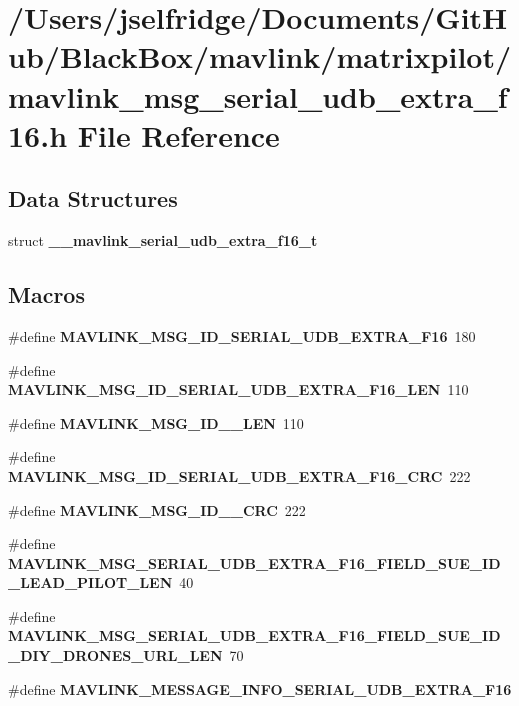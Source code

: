 \section{/\+Users/jselfridge/\+Documents/\+Git\+Hub/\+Black\+Box/mavlink/matrixpilot/mavlink\+\_\+msg\+\_\+serial\+\_\+udb\+\_\+extra\+\_\+f16.h File Reference}
\label{mavlink__msg__serial__udb__extra__f16_8h}
\subsection*{Data Structures}
\begin{DoxyCompactItemize}
\item 
struct \textbf{ \+\_\+\+\_\+mavlink\+\_\+serial\+\_\+udb\+\_\+extra\+\_\+f16\+\_\+t}
\end{DoxyCompactItemize}
\subsection*{Macros}
\begin{DoxyCompactItemize}
\item 
\#define \textbf{ M\+A\+V\+L\+I\+N\+K\+\_\+\+M\+S\+G\+\_\+\+I\+D\+\_\+\+S\+E\+R\+I\+A\+L\+\_\+\+U\+D\+B\+\_\+\+E\+X\+T\+R\+A\+\_\+\+F16}~180
\item 
\#define \textbf{ M\+A\+V\+L\+I\+N\+K\+\_\+\+M\+S\+G\+\_\+\+I\+D\+\_\+\+S\+E\+R\+I\+A\+L\+\_\+\+U\+D\+B\+\_\+\+E\+X\+T\+R\+A\+\_\+\+F16\+\_\+\+L\+EN}~110
\item 
\#define \textbf{ M\+A\+V\+L\+I\+N\+K\+\_\+\+M\+S\+G\+\_\+\+I\+D\+\_\+\_\+\+L\+EN}~110
\item 
\#define \textbf{ M\+A\+V\+L\+I\+N\+K\+\_\+\+M\+S\+G\+\_\+\+I\+D\+\_\+\+S\+E\+R\+I\+A\+L\+\_\+\+U\+D\+B\+\_\+\+E\+X\+T\+R\+A\+\_\+\+F16\+\_\+\+C\+RC}~222
\item 
\#define \textbf{ M\+A\+V\+L\+I\+N\+K\+\_\+\+M\+S\+G\+\_\+\+I\+D\+\_\+\_\+\+C\+RC}~222
\item 
\#define \textbf{ M\+A\+V\+L\+I\+N\+K\+\_\+\+M\+S\+G\+\_\+\+S\+E\+R\+I\+A\+L\+\_\+\+U\+D\+B\+\_\+\+E\+X\+T\+R\+A\+\_\+\+F16\+\_\+\+F\+I\+E\+L\+D\+\_\+\+S\+U\+E\+\_\+\+I\+D\+\_\+\+L\+E\+A\+D\+\_\+\+P\+I\+L\+O\+T\+\_\+\+L\+EN}~40
\item 
\#define \textbf{ M\+A\+V\+L\+I\+N\+K\+\_\+\+M\+S\+G\+\_\+\+S\+E\+R\+I\+A\+L\+\_\+\+U\+D\+B\+\_\+\+E\+X\+T\+R\+A\+\_\+\+F16\+\_\+\+F\+I\+E\+L\+D\+\_\+\+S\+U\+E\+\_\+\+I\+D\+\_\+\+D\+I\+Y\+\_\+\+D\+R\+O\+N\+E\+S\+\_\+\+U\+R\+L\+\_\+\+L\+EN}~70
\item 
\#define \textbf{ M\+A\+V\+L\+I\+N\+K\+\_\+\+M\+E\+S\+S\+A\+G\+E\+\_\+\+I\+N\+F\+O\+\_\+\+S\+E\+R\+I\+A\+L\+\_\+\+U\+D\+B\+\_\+\+E\+X\+T\+R\+A\+\_\+\+F16}
\end{DoxyCompactItemize}
